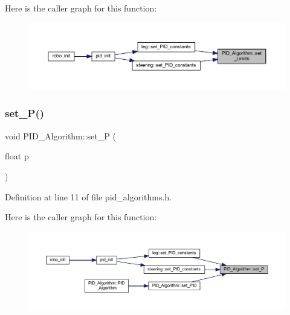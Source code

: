 Here is the caller graph for this function\+:
\nopagebreak
\begin{figure}[H]
\begin{center}
\leavevmode
\includegraphics[width=350pt]{class_p_i_d___algorithm_a100df14fcad2a1bbcb67c53b7d664d8a_icgraph}
\end{center}
\end{figure}
\mbox{\label{class_p_i_d___algorithm_a6248cf0e2677a45193c9b43b0001ee44}} 
\subsubsection{\texorpdfstring{set\_P()}{set\_P()}}
{\footnotesize\ttfamily void P\+I\+D\+\_\+\+Algorithm\+::set\+\_\+P (\begin{DoxyParamCaption}\item[{float}]{p }\end{DoxyParamCaption})\hspace{0.3cm}{\ttfamily [inline]}}



Definition at line 11 of file pid\+\_\+algorithms.\+h.

Here is the caller graph for this function\+:
\nopagebreak
\begin{figure}[H]
\begin{center}
\leavevmode
\includegraphics[width=350pt]{class_p_i_d___algorithm_a6248cf0e2677a45193c9b43b0001ee44_icgraph}
\end{center}
\end{figure}
\mbox{\label{class_p_i_d___algorithm_a1f6955b8c523af6e5207b598872b00f9}} 
